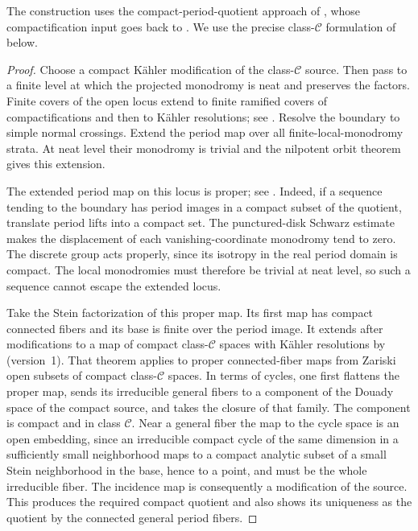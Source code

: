 The construction uses the compact-period-quotient approach of
\cite[Theorems~7.6--7.7]{BakkerBrunebarbeTsimerman}, whose
compactification input goes back to
\cite[Proposition~III and Remark~III-C]{SommesePeriodMapping}.
We use the precise class-$\mathcal C$ formulation of
\cite[Theorem~2.19]{VilladsenHodgeKahler} below.

\begin{proof}
Choose a compact K\"ahler modification of the class-$\mathcal C$
source. Then pass to a finite level at which the projected monodromy is
neat and preserves the factors.  Finite covers of the open locus
extend to finite ramified covers of compactifications and then to
Kähler resolutions; see \cite[Lemma~2.21]{VilladsenHodgeKahler}.
Resolve the boundary to simple normal crossings.  Extend the period
map over all finite-local-monodromy strata.  At neat level their
monodromy is trivial and the nilpotent orbit theorem gives this
extension.

The extended period map on this locus is proper; see
\cite[Proposition~9.11 and the proof of Theorem~9.6]{GriffithsPeriodsIII}.
Indeed, if a sequence tending to the boundary has period images in
a compact subset of the quotient, translate period lifts into a
compact set.
The punctured-disk Schwarz estimate makes the displacement of each
vanishing-coordinate monodromy tend to zero.  The discrete group
acts properly, since its isotropy in the real period domain is
compact.  The local monodromies must therefore be trivial at neat
level, so such a sequence cannot escape the extended locus.

Take the Stein factorization of this proper map.  Its first map has
compact connected fibers and its base is finite over the period
image.  It extends after modifications to a map of compact
class-$\mathcal C$ spaces with Kähler resolutions by
\cite[Theorem~2.19]{VilladsenHodgeKahler} (version~1).
That theorem applies to proper connected-fiber maps from Zariski
open subsets of compact class-$\mathcal C$ spaces.  In terms of
cycles, one first flattens the proper map, sends its irreducible general fibers
to a component of the Douady space of the compact source, and takes
the closure of that family.  The component is compact and in class
$\mathcal C$.  Near a general fiber the map to the cycle space is an
open embedding, since an irreducible compact cycle of the same
dimension in a sufficiently small neighborhood maps to a compact
analytic subset of a small Stein neighborhood in the base, hence
to a point, and must be the whole irreducible fiber.
The incidence map is consequently a modification of the source.
This produces the required compact quotient and also shows its
uniqueness as the quotient by the connected general period fibers.


\end{proof}
